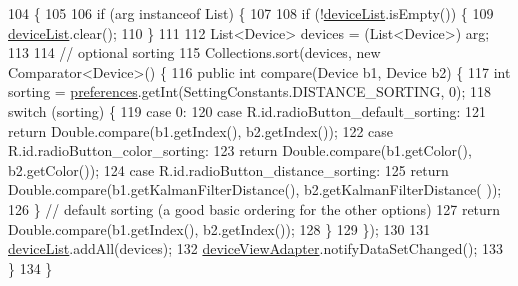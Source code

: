 \begin{DoxyCode}
104                                                  \{
105 
106         \textcolor{keywordflow}{if} (arg instanceof List) \{
107 
108             \textcolor{keywordflow}{if} (!\hyperlink{classit_1_1unibo_1_1torsello_1_1bluetoothpositioning_1_1fragment_1_1DeviceListFragment_a19a4a9cff961d3c319aaa80d5412a9a6_a19a4a9cff961d3c319aaa80d5412a9a6}{deviceList}.isEmpty()) \{
109                 \hyperlink{classit_1_1unibo_1_1torsello_1_1bluetoothpositioning_1_1fragment_1_1DeviceListFragment_a19a4a9cff961d3c319aaa80d5412a9a6_a19a4a9cff961d3c319aaa80d5412a9a6}{deviceList}.clear();
110             \}
111 
112             List<Device> devices = (List<Device>) arg;
113 
114             \textcolor{comment}{// optional sorting}
115             Collections.sort(devices, \textcolor{keyword}{new} Comparator<Device>() \{
116                 \textcolor{keyword}{public} \textcolor{keywordtype}{int} compare(Device b1, Device b2) \{
117                     \textcolor{keywordtype}{int} sorting = \hyperlink{classit_1_1unibo_1_1torsello_1_1bluetoothpositioning_1_1fragment_1_1DeviceListFragment_a3f583494281dbe65b3e76c28b5facbe7_a3f583494281dbe65b3e76c28b5facbe7}{preferences}.getInt(SettingConstants.DISTANCE\_SORTING, 0);
118                     \textcolor{keywordflow}{switch} (sorting) \{
119                         \textcolor{keywordflow}{case} 0:
120                         \textcolor{keywordflow}{case} R.id.radioButton\_default\_sorting:
121                             \textcolor{keywordflow}{return} Double.compare(b1.getIndex(), b2.getIndex());
122                         \textcolor{keywordflow}{case} R.id.radioButton\_color\_sorting:
123                             \textcolor{keywordflow}{return} Double.compare(b1.getColor(), b2.getColor());
124                         \textcolor{keywordflow}{case} R.id.radioButton\_distance\_sorting:
125                             \textcolor{keywordflow}{return} Double.compare(b1.getKalmanFilterDistance(), b2.getKalmanFilterDistance(
      ));
126                     \} \textcolor{comment}{// default sorting (a good basic ordering for the other options)}
127                     \textcolor{keywordflow}{return} Double.compare(b1.getIndex(), b2.getIndex());
128                 \}
129             \});
130 
131             \hyperlink{classit_1_1unibo_1_1torsello_1_1bluetoothpositioning_1_1fragment_1_1DeviceListFragment_a19a4a9cff961d3c319aaa80d5412a9a6_a19a4a9cff961d3c319aaa80d5412a9a6}{deviceList}.addAll(devices);
132             \hyperlink{classit_1_1unibo_1_1torsello_1_1bluetoothpositioning_1_1fragment_1_1DeviceListFragment_af33bdf009badab587a755e2e40dc4bc5_af33bdf009badab587a755e2e40dc4bc5}{deviceViewAdapter}.notifyDataSetChanged();
133         \}
134     \}
\end{DoxyCode}


